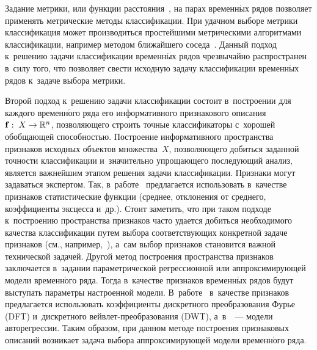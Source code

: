 \begin{multicols}{2}
Задание метрики, или функции расстояния~\cite{Ding:2008:QMT:1454159.1454226}, 
на парах временн$\acute{\mbox{ы}}$х рядов позволяет применять метрические методы классификации.
При удачном выборе метрики классификация может производиться простейшими метрическими 
алгоритмами классификации, например методом ближайшего соседа~\cite{jeong2011weighted}.
Данный подход к~решению задачи классификации временн$\acute{\mbox{ы}}$х рядов чрезвычайно распространен 
в~силу того, что позволяет свести исходную задачу классификации временн$\acute{\mbox{ы}}$х рядов 
к~задаче выбора метрики.

Второй подход к~решению задачи классификации состоит в~построении для 
каждого временн$\acute{\mbox{о}}$го ряда его информативного признакового 
описания~$\mathbf{f}:\;X\hm\to\mathbb{R}^n$, позволяющего строить точные 
классификаторы с~хорошей обобщающей способностью.
Построение информативного пространства признаков исходных объектов
 множества~$X$,\linebreak
  позволяющего добиться заданной точности классификации и~значительно 
 упрощающего по\-сле\-ду\-ющий анализ, является важнейшим этапом решения задачи классификации.
Признаки могут задавать\-ся экспертом.
Так, в~работе~\cite{Nanopoulos01feature-basedclassification} предлагается использовать 
в~качестве признаков статистические функции (среднее, отклонения от среднего, 
коэффициенты эксцесса и~др.).
Стоит заметить, что при таком подходе к~построению пространства признаков 
час\-то удается добиться необходимого качества классификации путем выбора 
соответствующих конкретной задаче признаков (см., например,~\cite{wiens2012patient}), 
а~сам выбор признаков становится важной технической задачей.
Другой метод построения пространства признаков заключается в~задании 
параметрической регрессионной или аппроксимирующей модели временн$\acute{\mbox{о}}$го ряда.
Тогда в~качестве признаков временн$\acute{\mbox{ы}}$х рядов будут выступать параметры 
настроенной модели.
В~работе~\cite{morchen2003time} в~качестве признаков предлагается 
использовать коэффициенты дискретного преобразования Фурье (DFT) 
и~дискретного вейв\-лет-пре\-обра\-зо\-ва\-ния (DWT), 
а~в~\cite{kini2013large, kuznetsov2015description}~--- модели авторегрессии.
Таким образом, при данном методе построения признаковых описаний 
возникает задача выбора аппроксимирующей модели временн$\acute{\mbox{о}}$го ряда.


\end{multicols}

